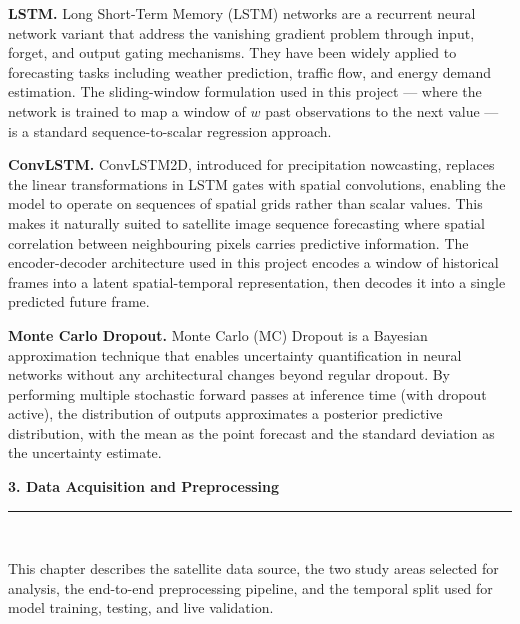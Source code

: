 \documentclass[12pt,a4paper]{report}
\begin{document}
\textbf{LSTM.} Long Short-Term Memory (LSTM) networks are a recurrent neural network variant that address the vanishing gradient problem through input, forget, and output gating mechanisms. They have been widely applied to forecasting tasks including weather prediction, traffic flow, and energy demand estimation. The sliding-window formulation used in this project --- where the network is trained to map a window of $w$ past observations to the next value --- is a standard sequence-to-scalar regression approach.

\textbf{ConvLSTM.} ConvLSTM2D, introduced for precipitation nowcasting, replaces the linear transformations in LSTM gates with spatial convolutions, enabling the model to operate on sequences of spatial grids rather than scalar values. This makes it naturally suited to satellite image sequence forecasting where spatial correlation between neighbouring pixels carries predictive information. The encoder-decoder architecture used in this project encodes a window of historical frames into a latent spatial-temporal representation, then decodes it into a single predicted future frame.

\textbf{Monte Carlo Dropout.} Monte Carlo (MC) Dropout is a Bayesian approximation technique that enables uncertainty quantification in neural networks without any architectural changes beyond regular dropout. By performing multiple stochastic forward passes at inference time (with dropout active), the distribution of outputs approximates a posterior predictive distribution, with the mean as the point forecast and the standard deviation as the uncertainty estimate.

\newpage
\thispagestyle{plain}
\begin{center}
    \hypertarget{sec:ch3}{}%
    {\Large \textbf{3. Data Acquisition and Preprocessing}}\\[0.3cm]
    \noindent\rule{\linewidth}{0.6pt}\\[0.8cm]
\end{center}
\setlength{\parindent}{1cm}
\setlength{\parskip}{6pt}
\justifying

This chapter describes the satellite data source, the two study areas selected for analysis, the end-to-end preprocessing pipeline, and the temporal split used for model training, testing, and live validation.
\end{document}
